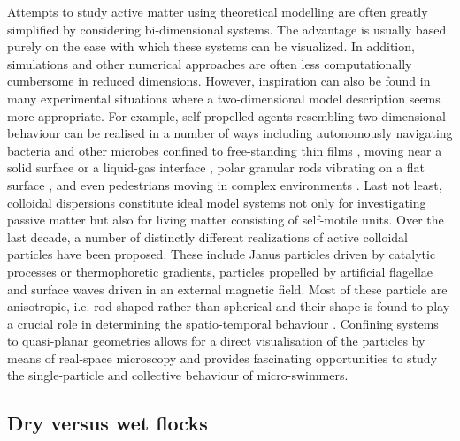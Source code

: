 \documentclass[amssymb]{revtex4}
\begin{document}
 Attempts to study active matter using theoretical modelling are often greatly simplified by considering bi-dimensional systems.  The advantage is usually based purely on the ease with which these systems can be visualized. In addition, simulations and other numerical approaches are often less computationally cumbersome in reduced dimensions.  However, inspiration can also be found in many experimental situations where a two-dimensional model description seems  more appropriate.
 For example, self-propelled agents resembling two-dimensional behaviour can be realised in a number of ways including autonomously
navigating bacteria and other microbes confined to free-standing thin films \cite{2007SoEtAl}, moving near a solid surface \cite{mino_clement}  or a liquid-gas interface \cite{2004DoEtAl, 2011Japan},  polar granular rods vibrating on a flat surface \cite{kudrolli,2007NaRaMe}, and even pedestrians moving in complex
environments \cite{Helbing}. Last not least, colloidal dispersions constitute ideal model systems
not only for investigating passive matter \cite{lowen2001,lowen2008} but also 
for living  matter consisting of self-motile units. Over the last decade, a number of distinctly different realizations of active colloidal particles have
been proposed. These include Janus particles  driven by catalytic processes
\cite{baraban,bocquet} or thermophoretic \cite{bechinger}  gradients,  particles propelled by artificial
flagellae \cite{dreyfusbibette} and surface waves \cite{snezhko_prl, snezhko_nature} driven in an external magnetic field. 
Most of these particle are anisotropic, i.e. rod-shaped rather than spherical and their shape is found to play a crucial role in determining the spatio-temporal behaviour  \cite{2006Peruani, Peruani2012}.  Confining systems to quasi-planar geometries allows for a direct visualisation of the particles by means of real-space microscopy and provides  fascinating opportunities to study the single-particle and collective behaviour of micro-swimmers.

 
    
  \subsection{Dry versus wet flocks}
  
\end{document}

